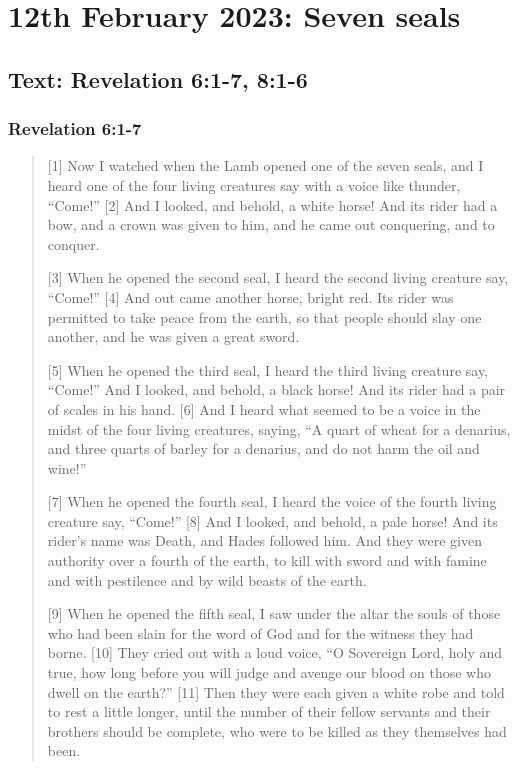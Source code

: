 \section{12th February 2023: Seven seals}
\subsection*{Text: Revelation 6:1-7, 8:1-6}
  \subsubsection*{Revelation 6:1-7}
  \begin{quote}
  [1] Now I watched when the Lamb opened one of the seven seals, and I heard
  one of the four living creatures say with a voice like thunder, “Come!” [2]
  And I looked, and behold, a white horse!  And its rider had a bow, and a
  crown was given to him, and he came out conquering, and to conquer.

  [3] When he opened the second seal, I heard the second living creature say,
  “Come!” [4] And out came another horse, bright red.  Its rider was
  permitted to take peace from the earth, so that people should slay one
  another, and he was given a great sword.

  [5] When he opened the third seal, I heard the third living creature say,
  “Come!” And I looked, and behold, a black horse!  And its rider had a pair
  of scales in his hand.  [6] And I heard what seemed to be a voice in the
  midst of the four living creatures, saying, “A quart of wheat for a
  denarius, and three quarts of barley for a denarius, and do not harm the
  oil and wine!”

  [7] When he opened the fourth seal, I heard the voice of the fourth living
  creature say, “Come!” [8] And I looked, and behold, a pale horse!  And its
  rider’s name was Death, and Hades followed him.  And they were given
  authority over a fourth of the earth, to kill with sword and with famine
  and with pestilence and by wild beasts of the earth.

  [9] When he opened the fifth seal, I saw under the altar the souls of those
  who had been slain for the word of God and for the witness they had borne.
  [10] They cried out with a loud voice, “O Sovereign Lord, holy and true,
  how long before you will judge and avenge our blood on those who dwell on
  the earth?” [11] Then they were each given a white robe and told to rest a
  little longer, until the number of their fellow servants and their brothers
  should be complete, who were to be killed as they themselves had been.


\end{quote}
